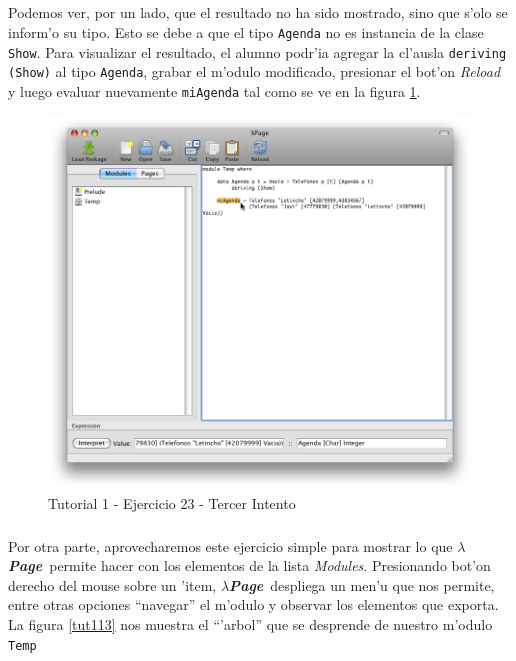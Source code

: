 \documentclass[a4paper]{article}
\newcommand{\hpage}{\textbf{\textsl{$\lambda$Page}}}
\begin{document}
\subparagraph{}Podemos ver, por un lado, que el resultado no ha sido mostrado, sino que s'olo se inform'o su tipo.  Esto se debe a que el tipo \texttt{Agenda} no es instancia de la clase \texttt{Show}.  Para visualizar el resultado, el alumno podr'ia agregar la cl'ausla \texttt{deriving (Show)} al tipo \texttt{Agenda}, grabar el m'odulo modificado, presionar el bot'on \textsl{Reload} y luego evaluar nuevamente \texttt{miAgenda} tal como se ve en la figura \ref{tut112}.
\begin{figure}[hp]
	\begin{center}
        	\includegraphics[width=.9\textwidth]{pictures/tut1/12}
		\caption{Tutorial 1 - Ejercicio 23 - Tercer Intento}
		\label{tut112}
	\end{center}
\end{figure}
\subparagraph{}Por otra parte, aprovecharemos este ejercicio simple para mostrar lo que \hpage\ permite hacer con los elementos de la lista \textsl{Modules}.  Presionando bot'on derecho del mouse sobre un 'item, \hpage\ despliega un men'u que nos permite, entre otras opciones ``navegar''  el m'odulo y observar los elementos que exporta.  La figura \ref{tut113} nos muestra el ``'arbol'' que se desprende de nuestro m'odulo \texttt{Temp}
\end{document}
